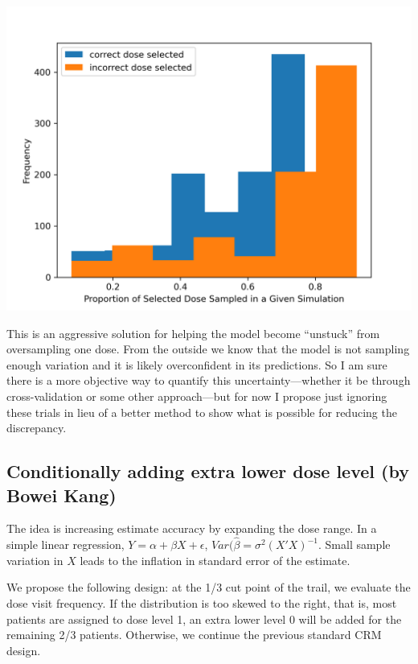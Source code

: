 \documentclass[
]{article}
\begin{document}
\includegraphics{gabe_sim_files/gabe_sim_fig.png}

This is an aggressive solution for helping the model become ``unstuck''
from oversampling one dose. From the outside we know that the model is
not sampling enough variation and it is likely overconfident in its
predictions. So I am sure there is a more objective way to quantify this
uncertainty---whether it be through cross-validation or some other
approach---but for now I propose just ignoring these trials in lieu of a
better method to show what is possible for reducing the discrepancy.

\hypertarget{conditionally-adding-extra-lower-dose-level-by-bowei-kang}{%
\subsection{Conditionally adding extra lower dose level (by Bowei
Kang)}\label{conditionally-adding-extra-lower-dose-level-by-bowei-kang}}

The idea is increasing estimate accuracy by expanding the dose range. In
a simple linear regression, \(Y = \alpha + \beta X + \epsilon\),
\(Var(\hat{\beta} = \sigma^2 (X′X)^{-1}\). Small sample variation in
\(X\) leads to the inflation in standard error of the estimate.

We propose the following design: at the 1/3 cut point of the trail, we
evaluate the dose visit frequency. If the distribution is too skewed to
the right, that is, most patients are assigned to dose level 1, an extra
lower level 0 will be added for the remaining 2/3 patients. Otherwise,
we continue the previous standard CRM design.
\end{document}
